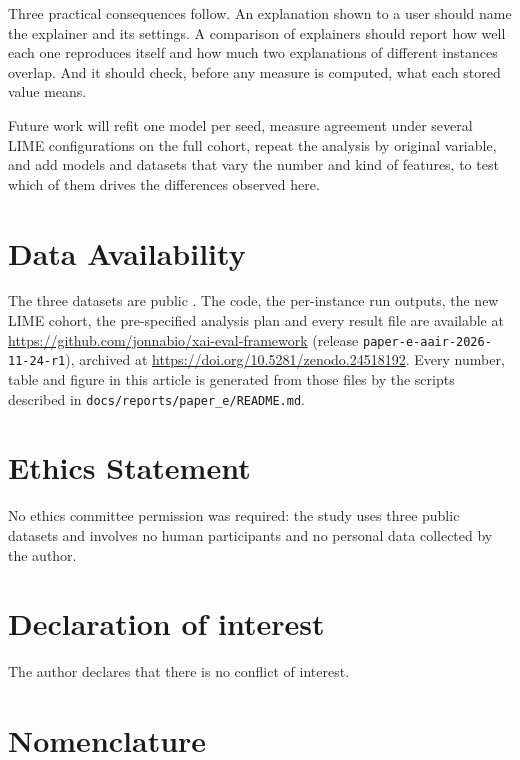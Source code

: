 Three practical consequences follow. An explanation shown to a user should name the
explainer and its settings. A comparison of explainers should report how well each one
reproduces itself and how much two explanations of different instances overlap. And it
should check, before any measure is computed, what each stored value means.

Future work will refit one model per seed, measure agreement under several LIME
configurations on the full cohort, repeat the analysis by original variable, and add models
and datasets that vary the number and kind of features, to test which of them drives the
differences observed here.

\section*{Data Availability}
The three datasets are public
\cite{becker1996adult,hofmann1994statlog,wolberg1993breast}. The code, the per-instance
run outputs, the new LIME cohort, the pre-specified analysis plan and every result file are
available at \url{https://github.com/jonnabio/xai-eval-framework} (release
\texttt{paper-e-aair-2026-11-24-r1}), archived at \url{https://doi.org/10.5281/zenodo.24518192}. Every number, table
and figure in this article is generated from those files by the scripts described in
\texttt{docs/reports/paper\_e/README.md}.

\section*{Ethics Statement}

No ethics committee permission was required: the study uses three public datasets and
involves no human participants and no personal data collected by the author.

\section*{Declaration of interest}

The author declares that there is no conflict of interest.

\section*{Nomenclature}

